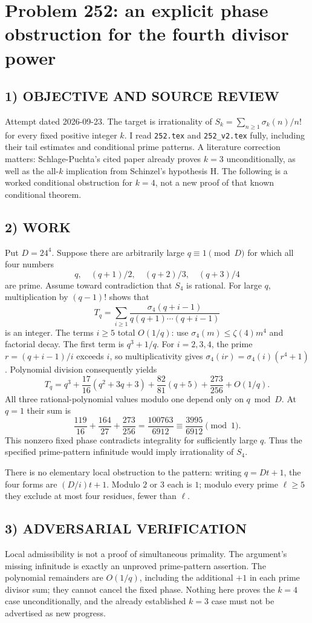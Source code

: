 \section{Problem 252: an explicit phase obstruction for the fourth divisor power}
\subsection*{1) OBJECTIVE AND SOURCE REVIEW}
Attempt dated 2026-09-23. The target is irrationality of $S_k=\sum_{n\ge1}\sigma_k(n)/n!$ for every fixed positive integer $k$. I read \texttt{252.tex} and \texttt{252\_v2.tex} fully, including their tail estimates and conditional prime patterns. A literature correction matters: Schlage-Puchta's cited paper already proves $k=3$ unconditionally, as well as the all-$k$ implication from Schinzel's hypothesis H. The following is a worked conditional obstruction for $k=4$, not a new proof of that known conditional theorem.
\subsection*{2) WORK}
Put $D=24^4$. Suppose there are arbitrarily large $q\equiv1\pmod D$ for which all four numbers
\[
q,\quad(q+1)/2,\quad(q+2)/3,\quad(q+3)/4
\]
are prime. Assume toward contradiction that $S_4$ is rational. For large $q$, multiplication by $(q-1)!$ shows that
\[
T_q=\sum_{i\ge1}\frac{\sigma_4(q+i-1)}{q(q+1)\cdots(q+i-1)}
\]
is an integer. The terms $i\ge5$ total $O(1/q)$: use $\sigma_4(m)\le\zeta(4)m^4$ and factorial decay. The first term is $q^3+1/q$. For $i=2,3,4$, the prime $r=(q+i-1)/i$ exceeds $i$, so multiplicativity gives $\sigma_4(ir)=\sigma_4(i)(r^4+1)$. Polynomial division consequently yields
\[
T_q=q^3+\frac{17}{16}(q^2+3q+3)
+\frac{82}{81}(q+5)+\frac{273}{256}+O(1/q).
\]
All three rational-polynomial values modulo one depend only on $q\bmod D$. At $q=1$ their sum is
\[
\frac{119}{16}+\frac{164}{27}+\frac{273}{256}
=\frac{100763}{6912}\equiv\frac{3995}{6912}\pmod1.
\]
This nonzero fixed phase contradicts integrality for sufficiently large $q$. Thus the specified prime-pattern infinitude would imply irrationality of $S_4$.

There is no elementary local obstruction to the pattern: writing $q=Dt+1$, the four forms are $(D/i)t+1$. Modulo $2$ or $3$ each is $1$; modulo every prime $\ell\ge5$ they exclude at most four residues, fewer than $\ell$.
\subsection*{3) ADVERSARIAL VERIFICATION}
Local admissibility is not a proof of simultaneous primality. The argument's missing infinitude is exactly an unproved prime-pattern assertion. The polynomial remainders are $O(1/q)$, including the additional $+1$ in each prime divisor sum; they cannot cancel the fixed phase. Nothing here proves the $k=4$ case unconditionally, and the already established $k=3$ case must not be advertised as new progress.
